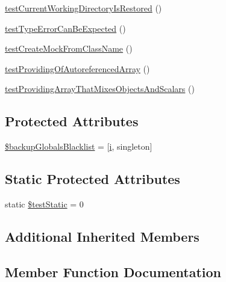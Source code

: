 \begin{DoxyCompactItemize}
\item 
\mbox{\hyperlink{class_framework___test_case_test_a5f892ed518d5716b9e50321a1a17db4e}{test\+Current\+Working\+Directory\+Is\+Restored}} ()
\item 
\mbox{\hyperlink{class_framework___test_case_test_a76919e69c6a8af134e578c60e41d15ae}{test\+Type\+Error\+Can\+Be\+Expected}} ()
\item 
\mbox{\hyperlink{class_framework___test_case_test_aa084fdbc21a4b325c3080d39fa0ef5fb}{test\+Create\+Mock\+From\+Class\+Name}} ()
\item 
\mbox{\hyperlink{class_framework___test_case_test_abefe85450d7d2c86bc8656184e48c65c}{test\+Providing\+Of\+Autoreferenced\+Array}} ()
\item 
\mbox{\hyperlink{class_framework___test_case_test_aff3d09b627bbabb0785b31ef0b70c545}{test\+Providing\+Array\+That\+Mixes\+Objects\+And\+Scalars}} ()
\end{DoxyCompactItemize}
\subsection*{Protected Attributes}
\begin{DoxyCompactItemize}
\item 
\mbox{\hyperlink{class_framework___test_case_test_aaf9b051088f79bef96185bef196e9329}{\$backup\+Globals\+Blacklist}} = \mbox{[}\textquotesingle{}\mbox{\hyperlink{interfacei}{i}}\textquotesingle{}, \textquotesingle{}singleton\textquotesingle{}\mbox{]}
\end{DoxyCompactItemize}
\subsection*{Static Protected Attributes}
\begin{DoxyCompactItemize}
\item 
static \mbox{\hyperlink{class_framework___test_case_test_a5b00d819a05fd0c19be31dfa17f99818}{\$test\+Static}} = 0
\end{DoxyCompactItemize}
\subsection*{Additional Inherited Members}


\subsection{Member Function Documentation}
\mbox{\label{class_framework___test_case_test_a2779e01464fe0af02e48519084df4946}} 
